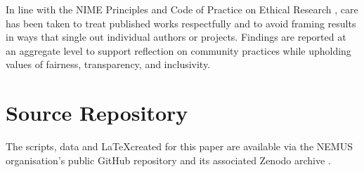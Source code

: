 \documentclass[sigconf]{nimeart}
\begin{document}
In line with the NIME Principles and Code of Practice on Ethical Research \cite{morreale_nime_2025}, care has been taken to treat published works respectfully and to avoid framing results in ways that single out individual authors or projects. Findings are reported at an aggregate level to support reflection on community practices while upholding values of fairness, transparency, and inclusivity.




\appendix

\section{Source Repository}
The scripts, data and \LaTeX created for this paper are available via the NEMUS organisation's public GitHub repository and its associated Zenodo archive \cite{this_paper}.
\end{document}
